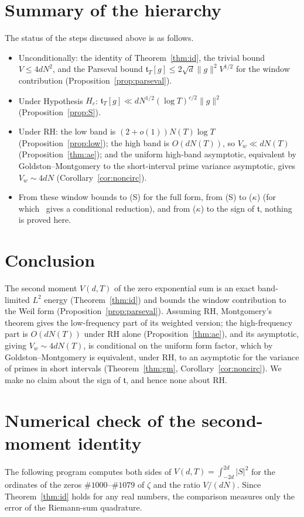 \documentclass[11pt]{amsart}
\theoremstyle{definition}
\theoremstyle{remark}
\newcommand{\ft}{\mathfrak t}
\begin{document}
\section{Summary of the hierarchy}
The status of the steps discussed above is as follows.
\begin{itemize}
\item Unconditionally: the identity of Theorem~\ref{thm:id}, the trivial bound
$V\le4dN^2$, and the Parseval bound $\ft_T[g]\le2\sqrt d\|g\|^2V^{1/2}$ for the
window contribution (Proposition~\ref{prop:parseval}).
\item Under Hypothesis $H_c$: $\ft_T[g]\ll dN^{1/2}(\log T)^{c/2}\|g\|^2$
(Proposition~\ref{prop:S}).
\item Under RH: the low band is $(2+o(1))N(T)\log T$ (Proposition~\ref{prop:low});
the high band is $O(dN(T))$, so $V_w\ll dN(T)$ (Proposition~\ref{thm:ae}); and the uniform high-band asymptotic, equivalent by
Goldston--Montgomery to the short-interval prime variance asymptotic, gives
$V_w\sim4dN$ (Corollary~\ref{cor:noncirc}).
\item From these window bounds to (S) for the full form, from (S) to ($\kappa$)
(for which~\cite{RP16} gives a conditional reduction), and from ($\kappa$) to the
sign of $\ft$, nothing is proved here.
\end{itemize}

\section{Conclusion}
The second moment $V(d,T)$ of the zero exponential sum is an exact band-limited
$L^2$ energy (Theorem~\ref{thm:id}) and bounds the window contribution to the
Weil form (Proposition~\ref{prop:parseval}). Assuming RH, Montgomery's theorem
gives the low-frequency part of its weighted version; the high-frequency part
is $O(dN(T))$ under RH alone (Proposition~\ref{thm:ae}), and its asymptotic,
giving $V_w\sim4dN(T)$, is conditional on the uniform form factor, which by Goldston--Montgomery is equivalent,
under RH, to an asymptotic for the variance of primes in short intervals
(Theorem~\ref{thm:gm}, Corollary~\ref{cor:noncirc}). We make no claim about the
sign of $\ft$, and hence none about RH.

\appendix
\section{Numerical check of the second-moment identity}\label{app:code}
The following program computes both sides of $V(d,T)=\int_{-2d}^{2d}|S|^2$ for
the ordinates of the zeros $\#1000$--$\#1079$ of $\zeta$ and the ratio
$V/(dN)$. Since Theorem~\ref{thm:id} holds for any real numbers, the comparison
measures only the error of the Riemann-sum quadrature.
\end{document}
